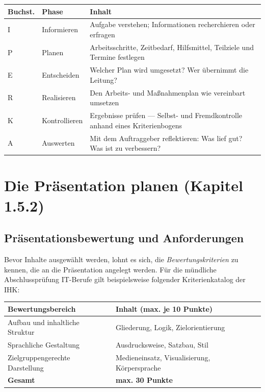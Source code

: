 \documentclass[11pt, a4paper]{article}
\begin{document}
\begin{center}
\begin{tabular}{p{1.5cm} p{3cm} p{8.5cm}}
\toprule
\textbf{Buchst.} & \textbf{Phase} & \textbf{Inhalt}\\
\midrule
I & Informieren & Aufgabe verstehen; Informationen recherchieren oder erfragen\\
\addlinespace
P & Planen & Arbeitsschritte, Zeitbedarf, Hilfsmittel, Teilziele und Termine festlegen\\
\addlinespace
E & Entscheiden & Welcher Plan wird umgesetzt? Wer übernimmt die Leitung?\\
\addlinespace
R & Realisieren & Den Arbeits- und Maßnahmenplan wie vereinbart umsetzen\\
\addlinespace
K & Kontrollieren & Ergebnisse prüfen — Selbst- und Fremdkontrolle anhand eines Kriterienbogens\\
\addlinespace
A & Auswerten & Mit dem Auftraggeber reflektieren: Was lief gut? Was ist zu verbessern?\\
\bottomrule
\end{tabular}
\end{center}

\section{Die Präsentation planen (Kapitel 1.5.2)}

\subsection{Präsentationsbewertung und Anforderungen}

Bevor Inhalte ausgewählt werden, lohnt es sich, die \emph{Bewertungskriterien} zu kennen, die an
die Präsentation angelegt werden. Für die mündliche Abschlussprüfung IT-Berufe gilt beispielsweise
folgender Kriterienkatalog der IHK:

\begin{center}
\begin{tabular}{p{5.5cm} p{7cm}}
\toprule
\textbf{Bewertungsbereich} & \textbf{Inhalt (max. je 10 Punkte)}\\
\midrule
Aufbau und inhaltliche Struktur & Gliederung, Logik, Zielorientierung\\
\addlinespace
Sprachliche Gestaltung & Ausdrucksweise, Satzbau, Stil\\
\addlinespace
Zielgruppengerechte Darstellung & Medieneinsatz, Visualisierung, Körpersprache\\
\midrule
\textbf{Gesamt} & \textbf{max. 30 Punkte}\\
\bottomrule
\end{tabular}
\end{center}
\end{document}
